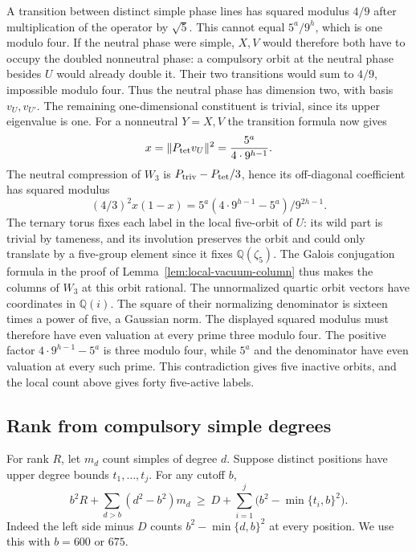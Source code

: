 \documentclass[11pt,a4paper]{article}
\numberwithin{equation}{section}
\theoremstyle{remark}
\newcommand{\QQ}{\mathbb Q}
\begin{document}
A transition between distinct simple phase lines has squared modulus $4/9$ after multiplication of the operator by $\sqrt5$. This cannot equal $5^a/9^h$, which is one modulo four. If the neutral phase were simple, $X,V$ would therefore both have to occupy the doubled nonneutral phase: a compulsory orbit at the neutral phase besides $U$ would already double it. Their two transitions would sum to $4/9$, impossible modulo four. Thus the neutral phase has dimension two, with basis $v_U,v_{U'}$. The remaining one-dimensional constituent is trivial, since its upper eigenvalue is one. For a nonneutral $Y=X,V$ the transition formula now gives
\[
 x=\|P_{\rm tet}v_U\|^2=\frac{5^a}{4\cdot9^{h-1}}.
\]
The neutral compression of $W_3$ is $P_{\rm triv}-P_{\rm tet}/3$, hence its off-diagonal coefficient has squared modulus
\[
      (4/3)^2x(1-x)=5^a(4\cdot9^{h-1}-5^a)/9^{2h-1}.
\]
The ternary torus fixes each label in the local five-orbit of $U$: its wild part is trivial by tameness, and its involution preserves the orbit and could only translate by a five-group element since it fixes $\QQ(\zeta_5)$. The Galois conjugation formula in the proof of Lemma~\ref{lem:local-vacuum-column} thus makes the columns of $W_3$ at this orbit rational. The unnormalized quartic orbit vectors have coordinates in $\QQ(i)$. The square of their normalizing denominator is sixteen times a power of five, a Gaussian norm. The displayed squared modulus must therefore have even valuation at every prime three modulo four. The positive factor $4\cdot9^{h-1}-5^a$ is three modulo four, while $5^a$ and the denominator have even valuation at every such prime. This contradiction gives five inactive orbits, and the local count above gives forty five-active labels.
\subsection{Rank from compulsory simple degrees}
\label{por:sec:rank-two-branches}
For rank $R$, let $m_d$ count simples of degree $d$. Suppose distinct positions have upper degree bounds $t_1,\dots,t_j$. For any cutoff $b$,
\begin{equation}\label{por:eq:budget600}
 b^2R+\sum_{d>b}(d^2-b^2)m_d
 \ \ge\ D+\sum_{i=1}^j\bigl(b^2-\min\{t_i,b\}^2\bigr).
\end{equation}
Indeed the left side minus $D$ counts $b^2-\min\{d,b\}^2$ at every position. We use this with $b=600$ or $675$.
\end{document}
